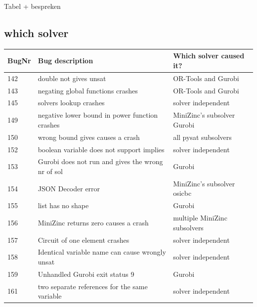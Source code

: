 Tabel + bespreken
\subsection{which solver}
\begin{table}[]
	\centering
	\begin{tabular}{lll}
		BugNr & Bug description                                           & Which solver caused it?\\ \toprule
		142   & double not gives unsat                                    & OR-Tools and Gurobi                            \\
		143   & negating global functions crashes                         & OR-Tools and Gurobi                            \\
		145   & solvers lookup crashes                                    & solver independent                             \\
		149   & negative lower bound in power function crashes            & MiniZinc's subsolver Gurobi                    \\
		150   & wrong bound gives causes a crash                          & all pysat subsolvers                           \\
		152   & boolean variable does not support implies                 & solver independent                             \\
		153   & Gurobi does not run and gives the wrong nr of sol         & Gurobi                                         \\
		154   & JSON Decoder error                                        & MiniZinc's subsolver osicbc                    \\
		155   & list has no shape                                         & Gurobi                                         \\
		156   & MiniZinc returns zero causes a crash                      & multiple MiniZinc subsolvers                   \\
		157   & Circuit of one element crashes                            & solver independent                             \\
		158   & Identical variable name can cause wrongly unsat           & solver independent                             \\
		159   & Unhandled Gurobi exit status 9                            & Gurobi                                         \\
		161   & two separate references for the same variable             & solver independent                             \\

\end{tabular}
\end{table}
